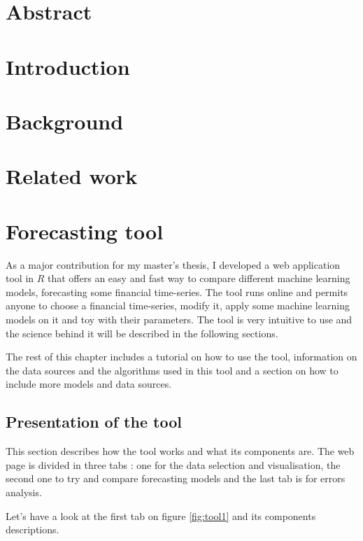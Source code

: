 \documentclass[11pt,a4paper,oneside]{book}
\begin{document}
\tableofcontents


\chapter*{Abstract}


\chapter{Introduction}


\chapter{Background}


\chapter{Related work}


\chapter{Forecasting tool}

As a major contribution for my master's thesis, I developed a web application tool in \textbf{$R$} that offers an easy and fast way to compare different machine learning models, forecasting some financial time-series. The tool runs online and permits anyone to choose a financial time-series, modify it, apply some machine learning models on it and toy with their parameters. The tool is very intuitive to use and the science behind it will be described in the following sections.

The rest of this chapter includes a tutorial on how to use the tool, information on the data sources and the algorithms used in this tool and a section on how to include more models and data sources. 


\section{Presentation of the tool}

This section describes how the tool works and what its components are. The web page is divided in three tabs : one for the data selection and visualisation, the second one to try and compare forecasting models and the last tab is for errors analysis. 

Let's have a look at the first tab on figure \ref{fig:tool1} and its components descriptions.
\end{document}
